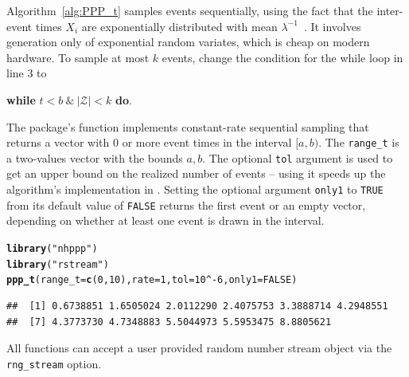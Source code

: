 \documentclass[article,nojss]{jss}\usepackage[]{graphicx}\usepackage[]{xcolor}
\makeatletter
\newcommand{\hlnum}[1]{\textcolor[rgb]{0.686,0.059,0.569}{#1}}%
\newcommand{\hlstr}[1]{\textcolor[rgb]{0.192,0.494,0.8}{#1}}%
\newcommand{\hlopt}[1]{\textcolor[rgb]{0,0,0}{#1}}%
\newcommand{\hlstd}[1]{\textcolor[rgb]{0.345,0.345,0.345}{#1}}%
\newcommand{\hlkwc}[1]{\textcolor[rgb]{0.333,0.667,0.333}{#1}}%
\newcommand{\hlkwd}[1]{\textcolor[rgb]{0.737,0.353,0.396}{\textbf{#1}}}%
\newenvironment{kframe}{%
 \def\at@end@of@kframe{}%
 \ifinner\ifhmode%
  \def\at@end@of@kframe{\end{minipage}}%
  \begin{minipage}{\columnwidth}%
 \fi\fi%
 \def\FrameCommand##1{\hskip\@totalleftmargin \hskip-\fboxsep
 \colorbox{shadecolor}{##1}\hskip-\fboxsep
     \hskip-\linewidth \hskip-\@totalleftmargin \hskip\columnwidth}%
 \MakeFramed {\advance\hsize-\width
   \@totalleftmargin\z@ \linewidth\hsize
   \@setminipage}}%
 {\par\unskip\endMakeFramed%
 \at@end@of@kframe}
\newenvironment{knitrout}{}{} %
\newcommand{\fct}[1]{\code{#1()}}
\makeatother
\begin{document}


Algorithm~\ref{alg:PPP_t} samples events sequentially, using the fact that the inter-event times $X_i$ are exponentially distributed with mean $\lambda^{-1}$~\citep[par. 4.1]{cox1965theory}. It involves generation only of exponential random variates, which is cheap on modern hardware. To sample at most $k$ events, change the condition for the while loop in line 3 to
\begin{center}
\textbf{while} {$t <b  \ \& \  |\mathcal{Z}| < k$} \textbf{do}.
\end{center}

The package's \fct{ppp\_t} function implements constant-rate sequential sampling that returns a vector with 0 or more event times in the interval $[a, b)$. The \texttt{range\_t} is a two-values vector with the bounds $a, b$. The optional \texttt{tol} argument is used to get an upper bound on the realized number of events -- using it speeds up the algorithm's implementation in . Setting the optional argument \texttt{only1} to \texttt{TRUE} from its default value of \texttt{FALSE} returns the first event or an empty vector, depending on whether at least one event is drawn in the interval.

\begin{knitrout}
\color{fgcolor}\begin{kframe}
\begin{alltt}
\hlkwd{library}\hlstd{(}\hlstr{"nhppp"}\hlstd{)}
\hlkwd{library}\hlstd{(}\hlstr{"rstream"}\hlstd{)}
\hlkwd{ppp_t}\hlstd{(}\hlkwc{range_t} \hlstd{=} \hlkwd{c}\hlstd{(}\hlnum{0}\hlstd{,} \hlnum{10}\hlstd{),} \hlkwc{rate} \hlstd{=} \hlnum{1}\hlstd{,} \hlkwc{tol} \hlstd{=} \hlnum{10}\hlopt{^-}\hlnum{6}\hlstd{,} \hlkwc{only1} \hlstd{=} \hlnum{FALSE}\hlstd{)}
\end{alltt}
\begin{verbatim}
##  [1] 0.6738851 1.6505024 2.0112290 2.4075753 3.3888714 4.2948551
##  [7] 4.3773730 4.7348883 5.5044973 5.5953475 8.8805621
\end{verbatim}
\end{kframe}
\end{knitrout}

All  functions can accept a user provided random number stream object via the \texttt{rng\_stream} option.
\end{document}
